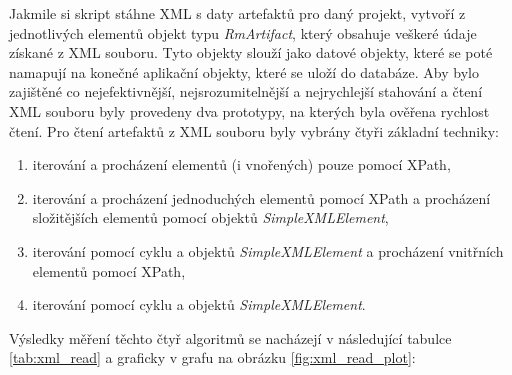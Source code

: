 \documentclass[czech,master]{diploma}
\begin{document}
Jakmile si skript stáhne XML s daty artefaktů pro daný projekt, vytvoří z jednotlivých elementů objekt typu \textit{RmArtifact}, který obsahuje veškeré údaje získané z XML souboru. Tyto objekty slouží jako datové objekty, které se poté namapují na konečné aplikační objekty, které se uloží do databáze. Aby bylo zajištěné co nejefektivnější, nejsrozumitelnější a nejrychlejší stahování a čtení XML souboru byly provedeny dva prototypy, na kterých byla ověřena rychlost čtení. Pro čtení artefaktů z XML souboru byly vybrány čtyři základní techniky:

\begin{enumerate}
\item iterování a procházení elementů (i vnořených) pouze pomocí XPath,
\item iterování a procházení jednoduchých elementů pomocí XPath a procházení složitějších elementů pomocí objektů \textit{SimpleXMLElement},
\item iterování pomocí cyklu a objektů \textit{SimpleXMLElement} a procházení vnitřních elementů pomocí XPath,
\item iterování pomocí cyklu a objektů \textit{SimpleXMLElement}.
\end{enumerate}

Výsledky měření těchto čtyř algoritmů se nacházejí v následující tabulce \ref{tab:xml_read} a graficky v grafu na obrázku \ref{fig:xml_read_plot}:
\end{document}

